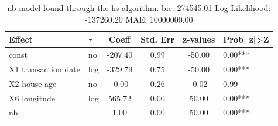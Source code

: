 \begin{table}
	\caption{nb model found through the hs algorithm. bic: 274545.01 Log-Likelihood: -137260.20 MAE: 10000000.00}
	\begin{center}
		\begin{tabular}{|l|l|c|c|c|l|}
			\hline
			Effect & $\tau$ & Coeff & Std. Err & z-values & Prob |z|>Z \\
			\hline
			const & no & -207.40 & 0.99 & -50.00 & 0.00*** \\
			\hline
			X1 transaction date & log & -329.79 & 0.75 & -50.00 & 0.00*** \\
			\hline
			X2 house age & no & -0.00 & 0.26 & -0.02 & 0.99 \\
			\hline
			X6 longitude & log & 565.72 & 0.00 & 50.00 & 0.00*** \\
			\hline
			nb &  & 1.00 & 0.00 & 50.00 & 0.00*** \\
			\hline
		\end{tabular}
	\end{center}
\end{table}